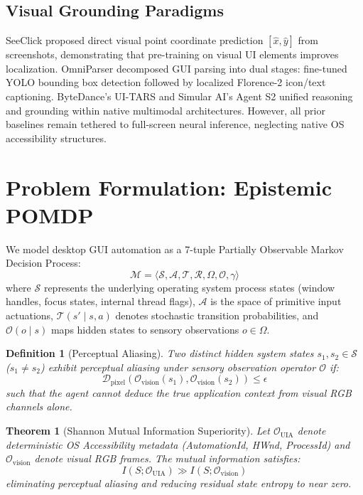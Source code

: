 \documentclass[10pt]{article}
\newtheorem{definition}{Definition}
\newtheorem{theorem}{Theorem}
\begin{document}
\subsection{Visual Grounding Paradigms}
SeeClick \cite{cheng2024seeclick} proposed direct visual point coordinate prediction $[\hat{x}, \hat{y}]$ from screenshots, demonstrating that pre-training on visual UI elements improves localization. OmniParser \cite{lu2024omniparser} decomposed GUI parsing into dual stages: fine-tuned YOLO bounding box detection followed by localized Florence-2 icon/text captioning. ByteDance's UI-TARS \cite{bytedance2025uitars} and Simular AI's Agent S2 \cite{simular2025agents2} unified reasoning and grounding within native multimodal architectures. However, all prior baselines remain tethered to full-screen neural inference, neglecting native OS accessibility structures.

\section{Problem Formulation: Epistemic POMDP}
\label{sec:pomdp}

We model desktop GUI automation as a 7-tuple Partially Observable Markov Decision Process:
\begin{equation}
\mathcal{M} = \langle \mathcal{S}, \mathcal{A}, \mathcal{T}, \mathcal{R}, \Omega, \mathcal{O}, \gamma \rangle
\end{equation}
where $\mathcal{S}$ represents the underlying operating system process states (window handles, focus states, internal thread flags), $\mathcal{A}$ is the space of primitive input actuations, $\mathcal{T}(s' \mid s, a)$ denotes stochastic transition probabilities, and $\mathcal{O}(o \mid s)$ maps hidden states to sensory observations $o \in \Omega$.

\begin{definition}[Perceptual Aliasing]
Two distinct hidden system states $s_1, s_2 \in \mathcal{S}$ ($s_1 \neq s_2$) exhibit perceptual aliasing under sensory observation operator $\mathcal{O}$ if:
\begin{equation}
\mathcal{D}_{\text{pixel}}(\mathcal{O}_{\text{vision}}(s_1), \mathcal{O}_{\text{vision}}(s_2)) \le \epsilon
\end{equation}
such that the agent cannot deduce the true application context from visual RGB channels alone.
\end{definition}

\begin{theorem}[Shannon Mutual Information Superiority]
Let $\mathcal{O}_{\text{UIA}}$ denote deterministic OS Accessibility metadata (AutomationId, HWnd, ProcessId) and $\mathcal{O}_{\text{vision}}$ denote visual RGB frames. The mutual information satisfies:
\begin{equation}
I(S; \mathcal{O}_{\text{UIA}}) \gg I(S; \mathcal{O}_{\text{vision}})
\end{equation}
eliminating perceptual aliasing and reducing residual state entropy to near zero.
\end{theorem}
\end{document}
